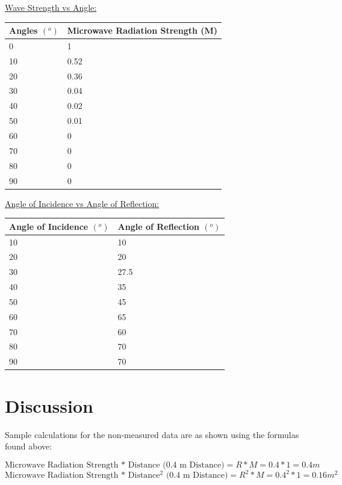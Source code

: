 \documentclass[11pt, titlepage]{article}
\begin{document}
\underline{Wave Strength vs Angle:}
\begin{center}
\begin{tabular}
{|m{9em}|m{18em}|}
\hline
Angles $(^o)$ & Microwave Radiation Strength (M) \\
\hline
0 & 1\\
\hline
10 & 0.52\\
\hline
20 & 0.36\\
\hline
30 & 0.04\\
\hline
40 & 0.02\\
\hline
50 & 0.01\\
\hline
60 & 0\\
\hline
70 & 0\\
\hline
80 & 0\\
\hline
90 & 0\\
\hline
\end{tabular}
\end{center}

\underline{Angle of Incidence vs Angle of Reflection:}
\begin{center}
\begin{tabular}
{|m{12em}|m{12em}|}
\hline
Angle of Incidence $(^o)$ & Angle of Reflection $(^o)$ \\
\hline
10 & 10\\
\hline
20 & 20\\
\hline
30 & 27.5\\
\hline
40 & 35\\
\hline
50 & 45\\
\hline
60 & 65\\
\hline
70 & 60\\
\hline
80 & 70\\
\hline
90 & 70\\
\hline
\end{tabular}
\end{center}

\section*{Discussion}
Sample calculations for the non-measured data are as shown using the formulas found above:

$$\text{Microwave Radiation Strength * Distance (0.4 m Distance)} = R * M = 0.4 * 1 = 0.4 m$$
$$\text{Microwave Radiation Strength * Distance$^2$ (0.4 m Distance)} = R^2 * M = 0.4^2 * 1 = 0.16 m^2$$
\end{document}
